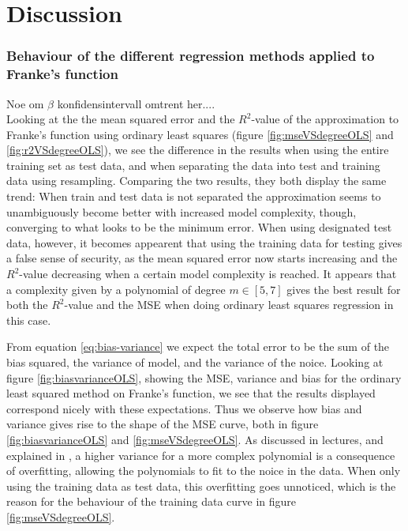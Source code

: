\section{Discussion}
\label{sec:discussion}

\subsubsection*{Behaviour of the different regression methods applied to Franke's function}

Noe om $\beta$ konfidensintervall omtrent her....\\

Looking at the  the mean squared error and the $R^2$-value of the approximation to Franke's function using ordinary least squares (figure \ref{fig:mseVSdegreeOLS} and \ref{fig:r2VSdegreeOLS}), we see the difference in the results when using the entire training set as test data, and when separating the data into test and training data using resampling. Comparing the two results, they both display the same trend: When train and test data is not separated the approximation seems to unambiguously become better with increased model complexity, though, converging to what looks to be the minimum error. When using designated test data, however, it becomes appearent that using the training data for testing gives a false sense of security, as the mean squared error now starts increasing and the $R^2$-value decreasing when a certain model complexity is reached. It appears that a complexity given by a polynomial of degree $m \in [5,7]$ gives the best result for both the $R^2$-value and the MSE when doing ordinary least squares regression in this case.

From equation \eqref{eq:bias-variance} we expect the total error to be the sum of the bias squared, the variance of model, and the variance of the noice. Looking at figure \ref{fig:biasvarianceOLS}, showing the MSE, variance and bias for the ordinary least squared method on Franke's function, we see that the results displayed correspond nicely with these expectations. Thus we observe how bias and variance gives rise to the shape of the MSE curve, both in figure \ref{fig:biasvarianceOLS} and \ref{fig:mseVSdegreeOLS}. As discussed in lectures, and explained in \cite{hastie2009elements}, a higher variance for a more complex polynomial is a consequence of overfitting, allowing the polynomials to fit to the noice in the data. When only using the training data as test data, this overfitting goes unnoticed, which is the reason for the behaviour of the training data curve in figure \ref{fig:mseVSdegreeOLS}.

